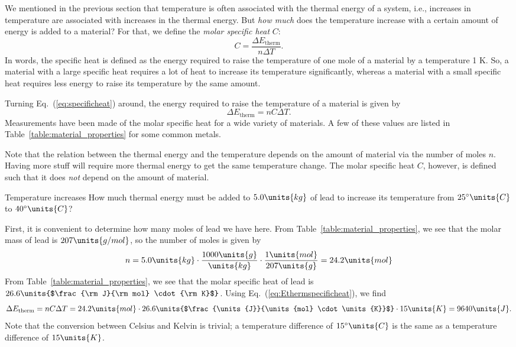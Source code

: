 We mentioned in the previous section that temperature is often associated
with the thermal energy of a system, i.e., increases in temperature
are associated with increases in the thermal energy.  But {\em how much}
does the temperature increase with a certain amount of energy is
added to a material?  For that, we define the {\em molar specific heat}
$C$:
\begin{equation}
C = \frac{\Delta E_\text{therm}}{n \Delta T}.
\label{eq:specificheat}
\end{equation}
In words, the specific heat is defined as the energy required to
raise the temperature of one mole of a material by a temperature 1 K.
So, a material with a large specific heat requires a lot of heat to
increase its temperature significantly, whereas a material with a
small specific heat requires less energy to raise its temperature by the
same amount.

Turning Eq.~(\ref{eq:specificheat}) around, the energy
required to raise the temperature of a material is given by
\begin{equation}
\Delta E_\text{therm} = n C \Delta T.
\label{eq:Ethermspecificheat}
\end{equation}
Measurements have been made of the molar specific heat for a wide
variety of materials.  A few of these values are listed in 
Table~\ref{table:material_properties} for some common metals.  

Note that the relation between the thermal
energy and the temperature depends on the amount of material via the
number of moles $n$. Having more stuff
will require more thermal energy to get the same temperature change.
The molar specific heat $C$, however, is defined such that it
does {\it not} depend on the amount of material.

\newpage

\begin{example}{Temperature increases}
How much thermal energy must be added to $5.0\units{kg}$ of lead to
increase its temperature from $25^{\circ}\units{C}$ to $40^{\circ}\units{C}$?

\solution First, it is convenient to determine how many moles of lead
we have here.  From Table~\ref{table:material_properties}, we see that
the molar mass of lead is $207\units{g/mol}$, so the number of moles
is given by
\begin{equation*}
n = 5.0\units{kg} \cdot \frac{1000\units{g}}{\units{kg}} \cdot 
\frac{1\units{mol}}{207\units{g}} = 24.2\units{mol}
\end{equation*}
From Table~\ref{table:material_properties}, we see that
the molar specific heat of lead is 
$26.6\units{$\frac{\rm J}{\rm mol} \cdot {\rm K}$}$.
Using Eq.~(\ref{eq:Ethermspecificheat}), we find
\begin{equation*}
\Delta E_\text{therm} = n C \Delta T = 24.2\units{mol} \cdot
26.6\units{$\frac{\units{J}}{\units{mol} \cdot \units{K}}$} \cdot 15\units{K} = 9640\units{J}.
\end{equation*}
Note that the conversion between Celsius and Kelvin is trivial; a
temperature difference of $15^{\circ}\units{C}$ is the same as a
temperature difference of $15\units{K}$.
\end{example}

